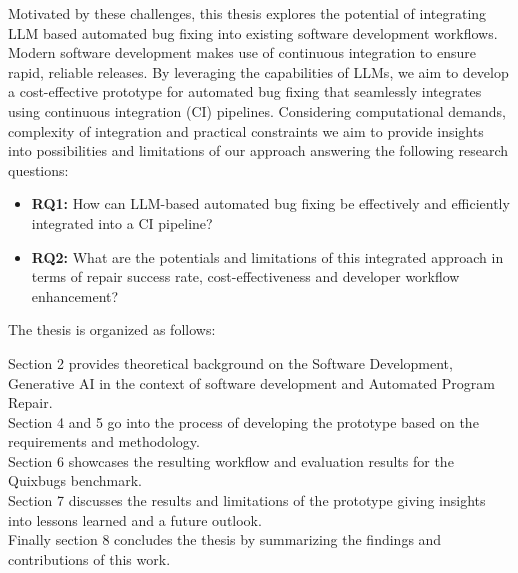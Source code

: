 Motivated by these challenges, this thesis explores the potential of integrating LLM based automated bug fixing into existing software development workflows. Modern software development makes use of continuous integration to ensure rapid, reliable releases. \cite{ugwuezeContinuousIntegrationDeployment2024} By leveraging the capabilities of LLMs, we aim to develop a cost-effective prototype for automated bug fixing that seamlessly integrates using continuous integration (CI) pipelines. Considering computational demands, complexity of integration and practical constraints we aim to provide insights into possibilities and limitations of our approach answering the following research questions:

\begin{itemize}
    \item \textbf{RQ1:} How can LLM-based automated bug fixing be effectively and efficiently integrated into a CI pipeline?
    \item \textbf{RQ2:} What are the potentials and limitations of this integrated approach in terms of repair success rate, cost-effectiveness and developer workflow enhancement?
\end{itemize}


The thesis is organized as follows:

Section 2 provides theoretical background on the Software Development, Generative AI in the context of software development and Automated Program Repair.\\
Section 4 and 5 go into the process of developing the prototype based on the requirements and methodology.\\
Section 6 showcases the resulting workflow and evaluation results for the Quixbugs benchmark.\\
Section 7 discusses the results and limitations of the prototype giving insights into lessons learned and a future outlook.\\
Finally section 8 concludes the thesis by summarizing the findings and contributions of this work.